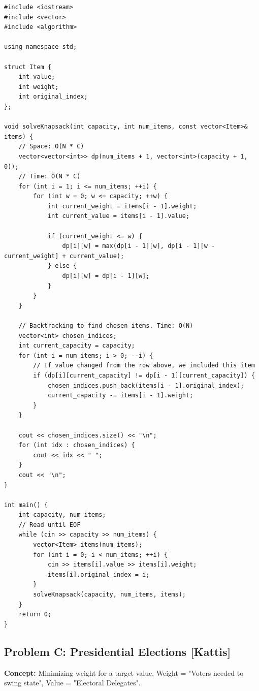 \begin{lstlisting}
#include <iostream>
#include <vector>
#include <algorithm>

using namespace std;

struct Item {
    int value;
    int weight;
    int original_index;
};

void solveKnapsack(int capacity, int num_items, const vector<Item>& items) {
    // Space: O(N * C)
    vector<vector<int>> dp(num_items + 1, vector<int>(capacity + 1, 0));
    // Time: O(N * C)
    for (int i = 1; i <= num_items; ++i) {
        for (int w = 0; w <= capacity; ++w) {
            int current_weight = items[i - 1].weight;
            int current_value = items[i - 1].value;
            
            if (current_weight <= w) {
                dp[i][w] = max(dp[i - 1][w], dp[i - 1][w - current_weight] + current_value);
            } else {
                dp[i][w] = dp[i - 1][w];
            }
        }
    }
    
    // Backtracking to find chosen items. Time: O(N)
    vector<int> chosen_indices;
    int current_capacity = capacity;
    for (int i = num_items; i > 0; --i) {
        // If value changed from the row above, we included this item
        if (dp[i][current_capacity] != dp[i - 1][current_capacity]) {
            chosen_indices.push_back(items[i - 1].original_index);
            current_capacity -= items[i - 1].weight;
        }
    }
    
    cout << chosen_indices.size() << "\n";
    for (int idx : chosen_indices) {
        cout << idx << " ";
    }
    cout << "\n";
}

int main() {
    int capacity, num_items;
    // Read until EOF
    while (cin >> capacity >> num_items) {
        vector<Item> items(num_items);
        for (int i = 0; i < num_items; ++i) {
            cin >> items[i].value >> items[i].weight;
            items[i].original_index = i;
        }
        solveKnapsack(capacity, num_items, items);
    }
    return 0;
}
\end{lstlisting}

\subsection{Problem C: Presidential Elections [Kattis]}
\textbf{Concept:} Minimizing weight for a target value.
Weight = "Voters needed to swing state", Value = "Electoral Delegates".


